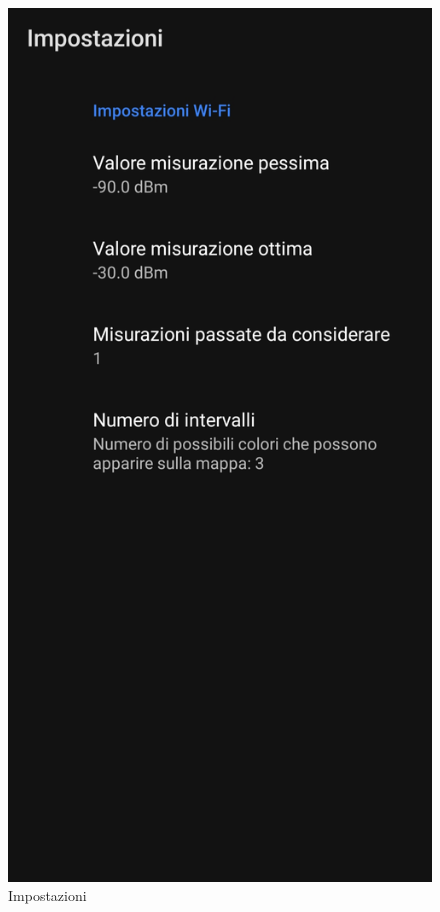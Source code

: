 \documentclass[11pt]{article}
\begin{document}
\begin{minipage}[b]{0.45\textwidth}
\begin{figure}[H]
\begin{minipage}[b]{0.35\textwidth}
    \end{minipage}
    \hspace*{1cm}
    \begin{minipage}[b]{0.45\textwidth}
      \includegraphics[width=\textwidth]{./img/overview/settings2.jpg}
    \end{minipage}
    \caption{Impostazioni} \label{fig:settings}
  \end{figure}
\end{minipage}
\end{document}
